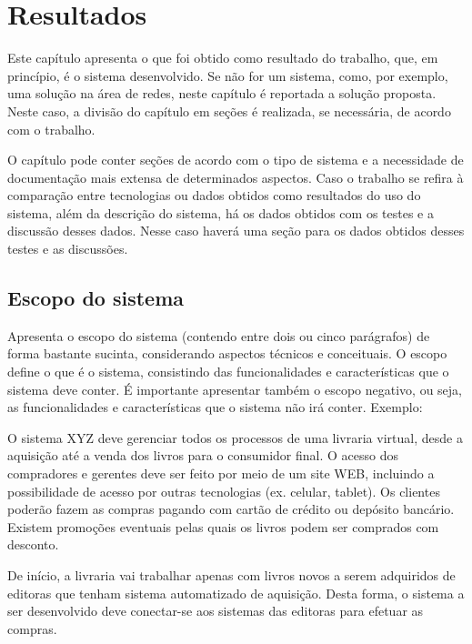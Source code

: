 
\chapter{Resultados}\label{cap:resultados}

Este capítulo apresenta o que foi obtido como resultado do trabalho, que, em princípio, é o sistema desenvolvido. Se não for um sistema, como, por exemplo, uma solução na área de redes, neste capítulo é reportada a solução proposta. Neste caso, a divisão do capítulo em seções é realizada, se necessária, de acordo com o trabalho.

O capítulo pode conter seções de acordo com o tipo de sistema e a necessidade de documentação mais extensa de determinados aspectos. Caso o trabalho se refira à comparação entre tecnologias ou dados obtidos como resultados do uso do sistema, além da descrição do sistema, há os dados obtidos com os testes e a discussão desses dados. Nesse caso haverá uma seção para os dados obtidos desses testes e as discussões.

\section{Escopo do sistema}\label{sec:escopoSistema}

Apresenta o escopo do sistema (contendo entre dois ou cinco parágrafos) de forma bastante sucinta, considerando aspectos técnicos e conceituais. O escopo define o que é o sistema, consistindo das funcionalidades e características que o sistema deve conter. É importante apresentar também o escopo negativo, ou seja, as funcionalidades e características que o sistema não irá conter. 
Exemplo:

O sistema XYZ deve gerenciar todos os processos de uma livraria virtual, desde a aquisição até a venda dos livros para o consumidor final. O acesso dos compradores e gerentes deve ser feito por meio de um site WEB, incluindo a possibilidade de acesso por outras tecnologias (ex. celular, tablet). Os clientes poderão fazem as compras pagando com cartão de crédito ou depósito bancário. Existem promoções eventuais pelas quais os livros podem ser comprados com desconto.

De início, a livraria vai trabalhar apenas com livros novos a serem adquiridos de editoras que tenham sistema automatizado de aquisição. Desta forma, o sistema a ser desenvolvido deve conectar-se aos sistemas das editoras para efetuar as compras.

